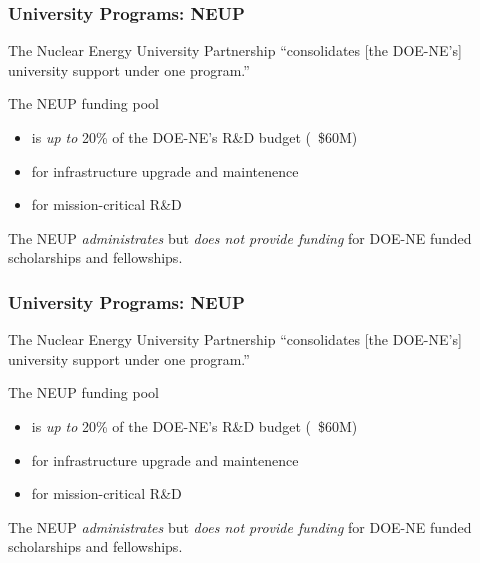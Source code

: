 \begin{frame}[ctb!]
  \frametitle{University Programs: NEUP}
  The Nuclear Energy University Partnership ``consolidates [the DOE-NE's] 
  university support under one program.''
  \vspace{0.4cm}
  \pause
  
  The NEUP funding pool
  \begin{itemize}
    \item is \emph{up to} 20\% of the DOE-NE's R&D budget (~\$60M)
    \item for infrastructure upgrade and maintenence
    \item for mission-critical R&D
  \end{itemize}
  \vspace{0.3cm}
  \pause
  
  The NEUP \emph{administrates} but \emph{does not provide funding} for
  DOE-NE funded scholarships and fellowships.
\end{frame}

\begin{frame}[ctb!]
  \frametitle{University Programs: NEUP}
  The Nuclear Energy University Partnership ``consolidates [the DOE-NE's] 
  university support under one program.''
  \vspace{0.4cm}
  \pause
  
  The NEUP funding pool
  \begin{itemize}
    \item is \emph{up to} 20\% of the DOE-NE's R&D budget (~\$60M)
    \item for infrastructure upgrade and maintenence
    \item for mission-critical R&D
  \end{itemize}
  \vspace{0.3cm}
  \pause
  
  The NEUP \emph{administrates} but \emph{does not provide funding} for
  DOE-NE funded scholarships and fellowships.
\end{frame}
